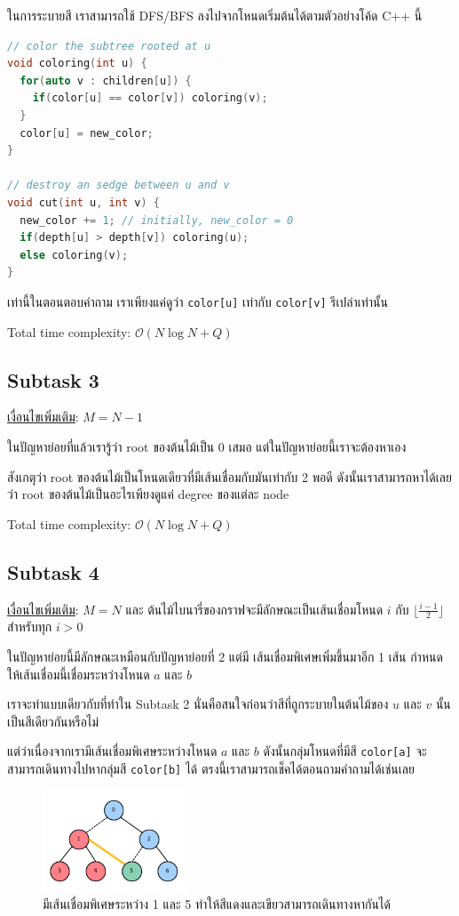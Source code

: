 \documentclass[12pt]{article}
\newcommand{\code}[1]{\texttt{\scriptsize{#1}}}
\newcommand{\floor}[1]{\lfloor #1 \rfloor}
\begin{document}
ในการระบายสี เราสามารถใช้ DFS/BFS ลงไปจากโหนดเริ่มต้นได้ตามตัวอย่างโค้ด C++ นี้

\begin{lstlisting}[language=C++]
// color the subtree rooted at u
void coloring(int u) {
  for(auto v : children[u]) {
    if(color[u] == color[v]) coloring(v);
  }
  color[u] = new_color;
}

// destroy an sedge between u and v
void cut(int u, int v) {
  new_color += 1; // initially, new_color = 0
  if(depth[u] > depth[v]) coloring(u);
  else coloring(v);
}
\end{lstlisting}

เท่านี้ในตอนตอบคำถาม เราเพียงแค่ดูว่า \code{color[u]} เท่ากับ \code{color[v]} รึเปล่าเท่านั้น

Total time complexity: $\mathcal{O}(N \log N + Q)$

\subsection{Subtask 3}

\underline{เงื่อนไขเพิ่มเติม}: $M = N-1$

ในปัญหาย่อยที่แล้วเรารู้ว่า root ของต้นไม้เป็น 0 เสมอ แต่ในปัญหาย่อยนี้เราจะต้องหาเอง

สังเกตุว่า root ของต้นไม้เป็นโหนดเดียวที่มีเส้นเชื่อมกับมันเท่ากับ 2 พอดี ดังนั้นเราสามารถหาได้เลยว่า root ของต้นไม้เป็นอะไรเพียงดูแค่ degree ของแต่ละ node

Total time complexity: $\mathcal{O}(N \log N + Q)$

\subsection{Subtask 4}

\underline{เงื่อนไขเพิ่มเติม}: $M = N$ และ ต้นไม้ไบนารี่ของกราฟจะมีลักษณะเป็นเส้นเชื่อมโหนด $i$ กับ $\floor{\frac{i-1}{2}}$ สำหรับทุก $i > 0$

ในปัญหาย่อยนี้มีลักษณะเหมือนกับปัญหาย่อยที่ 2 แต่มี เส้นเชื่อมพิเศษเพิ่มขึ้นมาอีก 1 เส้น กำหนดให้เส้นเชื่อมนี้เชื่อมระหว่างโหนด $a$ และ $b$

เราจะทำแบบเดียวกับที่ทำใน Subtask 2 นั่นคือสนใจก่อนว่าสีที่ถูกระบายในต้นไม้ของ $u$ และ $v$ นั้นเป็นสีเดียวกันหรือไม่ 

แต่ว่าเนื่องจากเรามีเส้นเชื่อมพิเศษระหว่างโหนด $a$ และ $b$ ดังนั้นกลุ่มโหนดที่มีสี \code{color[a]} จะสามารถเดินทางไปหากลุ่มสี \code{color[b]} ได้ ตรงนี้เราสามารถเช็คได้ตอนถามคำถามได้เช่นเลย

\begin{figure}[h]
  \centering
  \includegraphics[height=3cm]{./images/castle4.png}
  \captionsetup{labelformat=empty}
  \caption{มีเส้นเชื่อมพิเศษระหว่าง 1 และ 5 ทำให้สีแดงและเขียวสามารถเดินทางหากันได้}
\end{figure}
\end{document}

